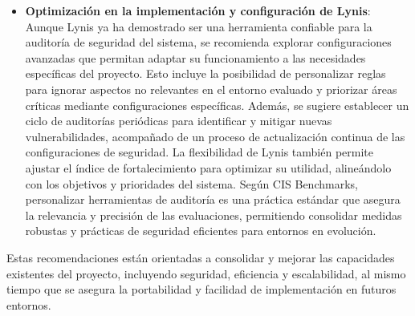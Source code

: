 \begin{itemize}[leftmargin=*,labelsep=5mm]
    \item \textbf{Optimización en la implementación y configuración de Lynis}: Aunque Lynis ya ha demostrado ser una herramienta confiable para la auditoría de seguridad del sistema, se recomienda explorar configuraciones avanzadas que permitan adaptar su funcionamiento a las necesidades específicas del proyecto. Esto incluye la posibilidad de personalizar reglas para ignorar aspectos no relevantes en el entorno evaluado y priorizar áreas críticas mediante configuraciones específicas. Además, se sugiere establecer un ciclo de auditorías periódicas para identificar y mitigar nuevas vulnerabilidades, acompañado de un proceso de actualización continua de las configuraciones de seguridad. La flexibilidad de Lynis también permite ajustar el índice de fortalecimiento para optimizar su utilidad, alineándolo con los objetivos y prioridades del sistema. Según CIS Benchmarks, personalizar herramientas de auditoría es una práctica estándar que asegura la relevancia y precisión de las evaluaciones, permitiendo consolidar medidas robustas y prácticas de seguridad eficientes para entornos en evolución.
\end{itemize}

Estas recomendaciones están orientadas a consolidar y mejorar las capacidades existentes del proyecto, incluyendo seguridad, eficiencia y escalabilidad, al mismo tiempo que se asegura la portabilidad y facilidad de implementación en futuros entornos.
